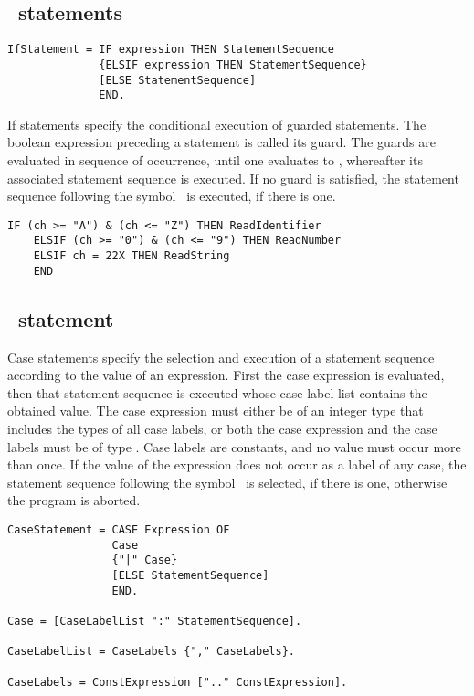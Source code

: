 \documentclass[12pt]{article}
\begin{document}
\subsection{\IF\ statements}

\begin{lstlisting}[style=ebnf]
IfStatement = IF expression THEN StatementSequence 
              {ELSIF expression THEN StatementSequence} 
              [ELSE StatementSequence]
              END.
\end{lstlisting} 

If statements specify the conditional execution of guarded statements. The boolean expression preceding a statement is called its guard. The guards are evaluated in sequence of occurrence, until one evaluates to \TRUE, whereafter its associated statement sequence is executed. If no guard is satisfied, the statement sequence following the symbol \ELSE\ is executed, if there is one.

\begin{lstlisting}[style=example]
    IF (ch >= "A") & (ch <= "Z") THEN ReadIdentifier 
    ELSIF (ch >= "0") & (ch <= "9") THEN ReadNumber 
    ELSIF ch = 22X THEN ReadString
    END
\end{lstlisting}

\subsection{\CASE\ statement}

Case statements specify the selection and execution of a statement sequence according to the value of an expression. 
First the case expression is evaluated, then that statement sequence is executed whose case label list contains the obtained value. 
The case expression must either be of an integer type that includes the types of all case labels, or both the case expression and the case labels must be of type \CHAR. Case labels are constants, and no value must occur more than once. If the value of the expression does not occur as a label of any case, the statement sequence following the symbol \ELSE\ is selected, if there is one, otherwise the program is aborted.

\begin{lstlisting}[style=ebnf]
CaseStatement = CASE Expression OF 
                Case 
                {"|" Case} 
                [ELSE StatementSequence] 
                END. 

Case = [CaseLabelList ":" StatementSequence].

CaseLabelList = CaseLabels {"," CaseLabels}.

CaseLabels = ConstExpression [".." ConstExpression].
\end{lstlisting} 
\end{document}
